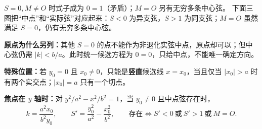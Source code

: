 \begin{statementbox}
\begin{minipage}{\linewidth}
$S=0,M\ne O$ 时式子成为 $0=1$（矛盾）；$M=O$ 另有无穷多条中心弦。
下面三图把“中点”和“实际弦”对应起来：$S<0$ 为异支弦，$S>1$ 为同支弦；$M=O$ 虽然满足 $S=0$，仍有无穷多条中心弦。
\begin{center}\end{center}
\end{minipage}
\par\medskip
\textbf{原点为什么另列：}其他 $S=0$ 的点不能作为非退化实弦中点，原点却可以；但中心弦仍需 $|k|<b/a$。此时统一候选方程为 $0=0$，只给中点，不能唯一确定方向。
\par\medskip\noindent
\textbf{特殊位置：}若 $y_0=0$ 且 $x_0\ne0$，只能是\textbf{竖直}候选线 $x=x_0$，当且仅当 $|x_0|>a$ 时有两个实交点；$|x_0|=a$ 只有一个切点。
\par\medskip\noindent
\textbf{焦点在 $y$ 轴时：}对 $y^2/a^2-x^2/b^2=1$，当 $y_0\ne0$ 且中点弦存在时，
\[
k=\frac{a^2x_0}{b^2y_0},\qquad
S'=\frac{y_0^2}{a^2}-\frac{x_0^2}{b^2},\qquad
\text{存在}\iff S'<0\ \text{或}\ S'>1\ \text{或}\ M=O.
\]
\end{statementbox}
